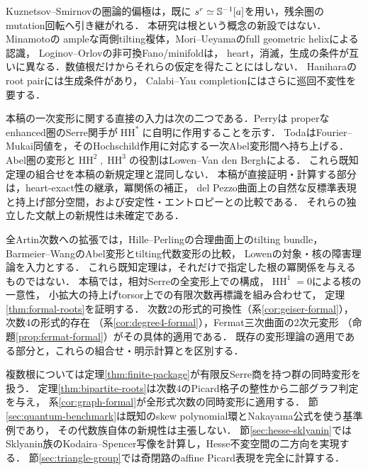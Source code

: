\documentclass[11pt,a4paper]{ltjsarticle}
\newcommand{\HH}{\operatorname{HH}}
\begin{document}
Kuznetsov--Smirnov\cite[Definition 2.1, Theorem 2.8]{KS}の圏論的偏極は，既に
$s^r\simeq\mathbb S^{-1}[a]$を用い，残余圏のmutation回転へ引き継がれる．
本研究は根という概念の新設ではない．Minamoto\cite[Definition 2.6, Theorem 2.8]{Minamoto}の
ampleな両側tilting複体，Mori--Ueyama\cite[Theorem 4.1]{MU}のfull geometric helixによる認識，
Loginov--Orlov\cite[Definitions 2.1, 2.6]{LO}の非可換Fano/minifoldは，
heart，消滅，生成の条件が互いに異なる．数値根だけからそれらの仮定を得たことにはしない．
Hanihara\cite[Definition 2.5, Theorem 3.3]{Hanihara}のroot pairには生成条件があり，
Calabi--Yau completionにはさらに巡回不変性を要する．

本稿の一次変形に関する直接の入力は次の二つである．Perry\cite[Proposition 1.2, \S5]{Perry}は
properなenhanced圏のSerre関手が$\HH^*$に自明に作用することを示す．
Toda\cite[Theorem 1.1]{Toda}はFourier--Mukai同値を，そのHochschild作用に対応する一次Abel変形間へ持ち上げる．
Abel圏の変形と$\HH^2,\HH^3$の役割はLowen--Van den Bergh\cite[Theorem 3.1]{LVdB}による．
これら既知定理の組合せを本稿の新規定理と混同しない．
本稿が直接証明・計算する部分は，heart-exact性の継承，冪関係の補正，
del Pezzo曲面上の自然な反標準表現と持上げ部分空間，および安定性・エントロピーとの比較である．
それらの独立した文献上の新規性は未確定である．

全Artin次数への拡張では，Hille--Perling\cite[Theorem 1.1]{HP}の合理曲面上のtilting bundle，
Barmeier--Wang\cite[Theorem 3.18, Proposition 3.21]{BW}のAbel変形とtilting代数変形の比較，
Lowen\cite[Theorems A, B]{LowenOb}の対象・核の障害理論を入力とする．
これら既知定理は，それだけで指定した根の冪関係を与えるものではない．
本稿では，相対Serreの全変形上での構成，$\HH^1=0$による核の一意性，
小拡大の持上げtorsor上での有限次数再標識を組み合わせて，
定理\ref{thm:formal-roots}を証明する．
次数2の形式的可換性（系\ref{cor:geiser-formal}），次数4の形式的存在
（系\ref{cor:degree4-formal}），Fermat三次曲面の2次元変形
（命題\ref{prop:fermat-formal}）がその具体的適用である．
既存の変形理論の適用である部分と，これらの組合せ・明示計算とを区別する．

複数根については定理\ref{thm:finite-package}が有限反Serre商を持つ群の同時変形を扱う．
定理\ref{thm:bipartite-roots}は次数4のPicard格子の整性から二部グラフ判定を与え，
系\ref{cor:graph-formal}が全形式次数の同時変形に適用する．
節\ref{sec:quantum-benchmark}は既知のskew polynomial環とNakayama公式\cite[Example 5.5]{RRZ}を使う基準例であり，
その代数族自体の新規性は主張しない．
節\ref{sec:hesse-sklyanin}ではSklyanin族のKodaira--Spencer写像を計算し，Hesse不変空間の二方向を実現する．
節\ref{sec:triangle-group}では奇閉路のaffine Picard表現を完全に計算する．
\end{document}
